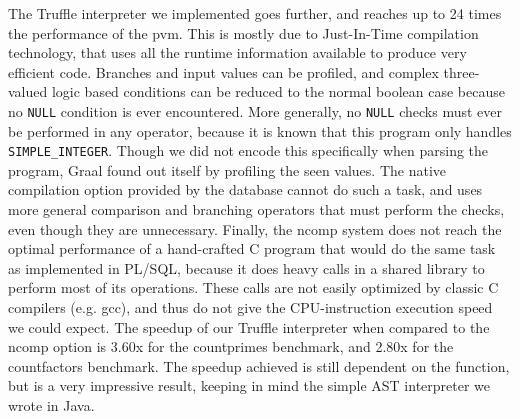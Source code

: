 \documentclass[twoside,11pt,a4paper]{article}
\newcommand{\pls}[1]{\small\texttt{#1}\normalsize}
\newcommand{\plstype}[1]{\pls{#1}}
\newcommand{\simpleint}{\plstype{SIMPLE\_INTEGER}}
\newcommand{\plsnull}{\pls{NULL}}
\newcommand{\benchsystem}[1]{\textsf{#1}}
\newcommand{\pvm}{\benchsystem{pvm}}
\newcommand{\ncomp}{\benchsystem{ncomp}}
\newcommand{\bench}[1]{\textsf{#1}}
\begin{document}
The Truffle interpreter we implemented goes further, and reaches up to 24 times the performance of the \pvm{}. This is mostly due to Just-In-Time compilation technology, that uses all the runtime information available to produce very efficient code. Branches and input values can be profiled, and complex three-valued logic based conditions can be reduced to the normal boolean case because no \plsnull{} condition is ever encountered. More generally, no \plsnull{} checks must ever be performed in any operator, because it is known that this program only handles \simpleint{}. Though we did not encode this specifically when parsing the program, Graal found out itself by profiling the seen values. The native compilation option provided by the database cannot do such a task, and uses more general comparison and branching operators that must perform the checks, even though they are unnecessary. Finally, the \ncomp{} system does not reach the optimal performance of a hand-crafted C program that would do the same task as implemented in PL/SQL, because it does heavy calls in a shared library to perform most of its operations. These calls are not easily optimized by classic C compilers (e.g. gcc), and thus do not give the CPU-instruction execution speed we could expect. The speedup of our Truffle interpreter when compared to the \ncomp{} option is 3.60x for the \bench{countprimes} benchmark, and 2.80x for the \bench{countfactors} benchmark. The speedup achieved is still dependent on the function, but is a very impressive result, keeping in mind the simple AST interpreter we wrote in Java.
\end{document}
